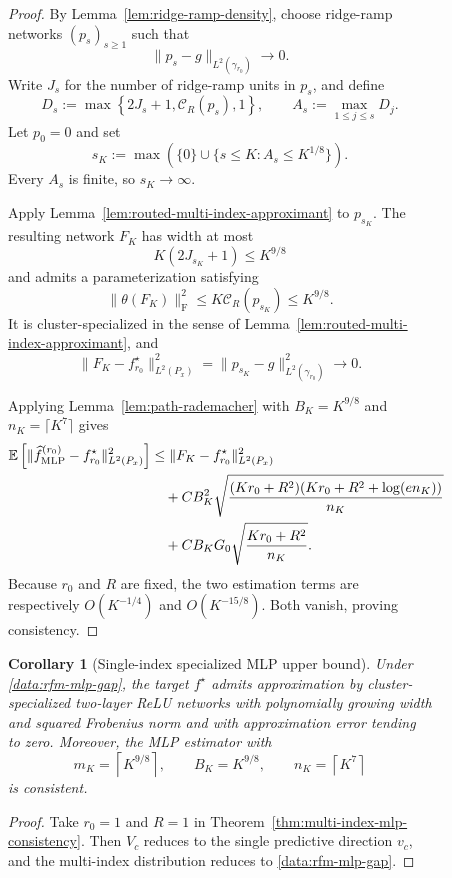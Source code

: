 \documentclass{article}
\newtheorem{corollary}[corollary]{Corollary}
\begin{document}
\begin{figure}
\begin{proof}
By Lemma~\ref{lem:ridge-ramp-density}, choose ridge-ramp networks
$(p_s)_{s\geq1}$ such that
\[
    \|p_s-g\|_{L^2(\gamma_{r_0})}\longrightarrow0.
\]
Write $J_s$ for the number of ridge-ramp units in $p_s$, and define
\[
    D_s:=\max\left\{2J_s+1,\mathcal C_R(p_s),1\right\},
    \qquad
    A_s:=\max_{1\leq j\leq s}D_j.
\]
Let $p_0=0$ and set
\[
    s_K
    :=\max\left(
        \{0\}\cup
        \{s\leq K:A_s\leq K^{1/8}\}
      \right).
\]
Every $A_s$ is finite, so $s_K\to\infty$.

Apply Lemma~\ref{lem:routed-multi-index-approximant} to $p_{s_K}$. The
resulting network $F_K$ has width at most
\[
    K(2J_{s_K}+1)\leq K^{9/8}
\]
and admits a parameterization satisfying
\[
    \|\theta(F_K)\|_{\mathrm F}^2
    \leq K\mathcal C_R(p_{s_K})
    \leq K^{9/8}.
\]
It is cluster-specialized in the sense of
Lemma~\ref{lem:routed-multi-index-approximant}, and
\[
    \|F_K-f_{r_0}^\star\|_{L^2(P_x)}^2
    =\|p_{s_K}-g\|_{L^2(\gamma_{r_0})}^2
    \longrightarrow0.
\]

Applying Lemma~\ref{lem:path-rademacher} with
$B_K=K^{9/8}$ and $n_K=\lceil K^7\rceil$ gives
\begin{align*}
    \mathbb E\left[
        \|\widehat f_{\mathrm{MLP}}^{(r_0)}-f_{r_0}^\star
        \|_{L^2(P_x)}^2
    \right]
    &\leq
    \|F_K-f_{r_0}^\star\|_{L^2(P_x)}^2\\
    &\quad+
    CB_K^2\sqrt{
        {(Kr_0+R^2)(Kr_0+R^2+\log(en_K))\over n_K}
    }\\
    &\quad+
    CB_KG_0\sqrt{{Kr_0+R^2\over n_K}}.
\end{align*}
Because $r_0$ and $R$ are fixed, the two estimation terms are respectively
$O(K^{-1/4})$ and $O(K^{-15/8})$. Both vanish, proving consistency.
\end{proof}

\begin{corollary}[Single-index specialized MLP upper bound]
\label{cor:single-index-mlp-consistency}
Under \cref{data:rfm-mlp-gap}, the target $f^\star$ admits approximation by
cluster-specialized two-layer ReLU networks with polynomially growing width
and squared Frobenius norm and with approximation error tending to zero.
Moreover, the MLP estimator with
\[
    m_K=\left\lceil K^{9/8}\right\rceil,
    \qquad
    B_K=K^{9/8},
    \qquad
    n_K=\left\lceil K^7\right\rceil
\]
is consistent.
\end{corollary}

\begin{proof}
Take $r_0=1$ and $R=1$ in
Theorem~\ref{thm:multi-index-mlp-consistency}. Then $V_c$ reduces to the
single predictive direction $v_c$, and the multi-index distribution reduces
to \cref{data:rfm-mlp-gap}.
\end{proof}


\end{figure}
\end{document}
